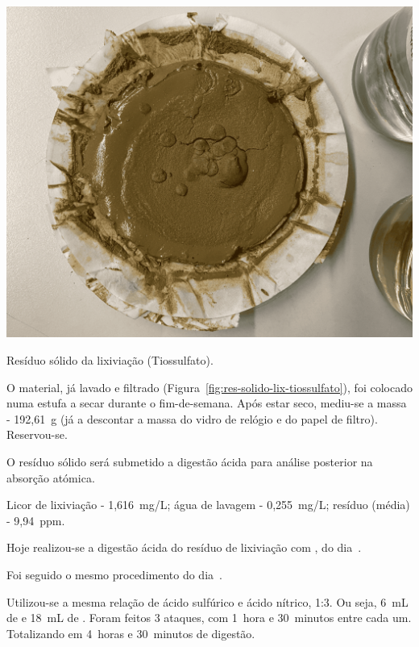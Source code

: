 \begin{marginfigure}
    \centering
    \includegraphics[width=0.9\linewidth]{figures/residuo_sol_lix_tiossulfato}
    \caption{Resíduo sólido da lixiviação (Tiossulfato).}
    \label{fig:res-solido-lix-tiossulfato}
\end{marginfigure}

O material, já lavado e filtrado (Figura~\ref{fig:res-solido-lix-tiossulfato}), foi colocado numa estufa a secar durante o fim-de-semana.
Após estar seco, mediu-se a massa - 192,61~g (já a descontar a massa do vidro de relógio e do papel de filtro).
Reservou-se.

O resíduo sólido será submetido a digestão ácida para análise posterior na absorção atómica.

 Licor de lixiviação - 1,616~mg/L; água de lavagem - 0,255~mg/L; resíduo (média) - 9,94~ppm.

\hrulefill



Hoje realizou-se a digestão ácida do resíduo de lixiviação com \TSP{}, do dia~.

Foi seguido o mesmo procedimento do dia~.

Utilizou-se a mesma relação de ácido sulfúrico e ácido nítrico, 1:3.
Ou seja, 6~mL de  e 18~mL de .
Foram feitos 3 ataques, com 1~hora e 30~minutos entre cada um.
Totalizando em 4~horas e 30~minutos de digestão.

